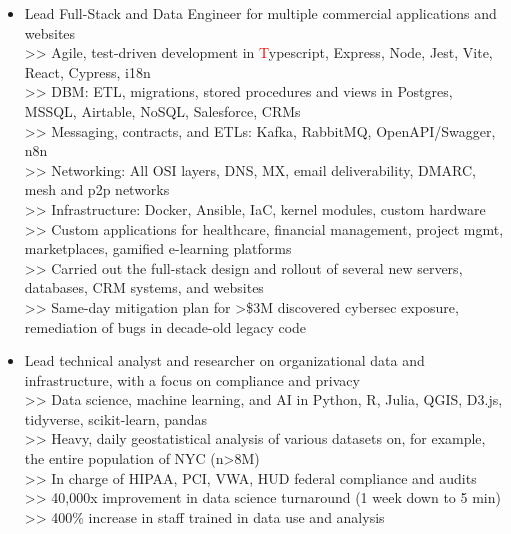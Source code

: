 \begin{itemize}
        \item Lead Full-Stack and Data Engineer for multiple commercial applications and websites
        \\ >> Agile, test-driven development in {\textcolor{red}Typescript, Express, Node, Jest, Vite, React, Cypress, i18n}
        \\ >> DBM: ETL, migrations, stored procedures and views in Postgres, MSSQL, Airtable, NoSQL, Salesforce, CRMs
        \\ >> Messaging, contracts, and ETLs: Kafka, RabbitMQ, OpenAPI/Swagger, n8n
        \\ >> Networking: All OSI layers, DNS, MX, email deliverability, DMARC, mesh and p2p networks
        \\ >> Infrastructure: Docker, Ansible, IaC, kernel modules, custom hardware
        \\ >> Custom applications for healthcare, financial management, project mgmt, marketplaces, gamified e-learning platforms
        \\ >> Carried out the full-stack design and rollout of several new servers, databases, CRM systems, and websites
        \\ >> Same-day mitigation plan for >\$3M discovered cybersec exposure, remediation of bugs in decade-old legacy code

        \item Lead technical analyst and researcher on organizational data and infrastructure, with a focus on compliance and privacy
        \\ >> Data science, machine learning, and AI in Python, R, Julia, QGIS, D3.js, tidyverse, scikit-learn, pandas
        \\ >> Heavy, daily geostatistical analysis of various datasets on, for example, the entire population of NYC (n>8M)
        \\ >> In charge of HIPAA, PCI, VWA, HUD federal compliance and audits
        \\ >> 40,000x improvement in data science turnaround (1 week down to 5 min)
        \\ >> 400\% increase in staff trained in data use and analysis


\end{itemize}
